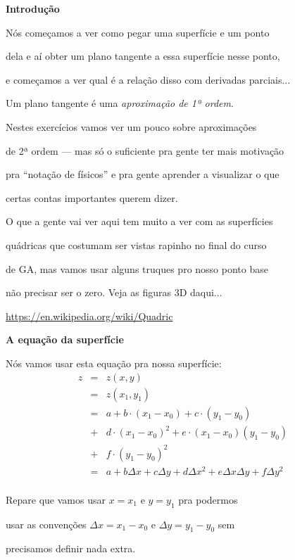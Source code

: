 \documentclass[oneside,12pt]{article}
\begin{document}
\newpage

{\bf Introdução}

Nós começamos a ver como pegar uma superfície e um ponto

dela e aí obter um plano tangente a essa superfície nesse ponto,

e começamos a ver qual é a relação disso com derivadas parciais...

\msk

Um plano tangente é uma {\sl aproximação de 1ª ordem}.

Nestes exercícios vamos ver um pouco sobre aproximações

de 2ª ordem --- mas só o suficiente pra gente ter mais motivação

pra ``notação de físicos'' e pra gente aprender a visualizar o que

certas contas importantes querem dizer.


\msk

O que a gente vai ver aqui tem muito a ver com as superfícies

quádricas que costumam ser vistas rapinho no final do curso

de GA, mas vamos usar alguns truques pro nosso ponto base

não precisar ser o zero. Veja as figuras 3D daqui...

\msk

{\scriptsize

\url{https://en.wikipedia.org/wiki/Quadric}

}


\newpage

{\bf A equação da superfície}

Nós vamos usar esta equação pra nossa superfície:
%
$$\begin{array}{rcl}
  z &=& z(x,y) \\
    &=& z(x_1,y_1) \\
    &=& a + b·(x_1-x_0) + c·(y_1-y_0) \\
    &+& d·(x_1-x_0)^2 + e·(x_1-x_0)(y_1-y_0) \\
    &+& f·(y_1-y_0)^2 \\
    &=& a + bΔx + cΔy + dΔx^2 + eΔxΔy + fΔy^2 \\
  \end{array}
$$

Repare que vamos usar $x=x_1$ e $y=y_1$ pra podermos

usar as convenções $Δx=x_1-x_0$ e $Δy=y_1-y_0$ sem

precisamos definir nada extra.
\end{document}
